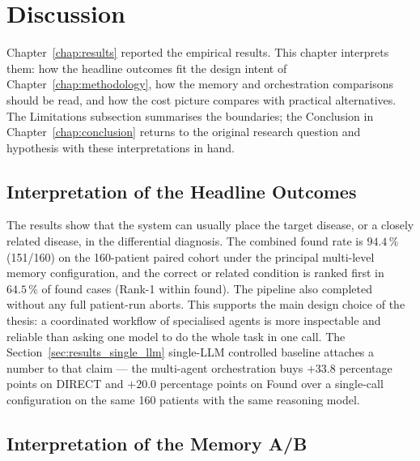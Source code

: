 \chapter{Discussion}
\label{chap:discussion}

Chapter~\ref{chap:results} reported the empirical results. This chapter
interprets them: how the headline outcomes fit the design intent of
Chapter~\ref{chap:methodology}, how the memory and orchestration
comparisons should be read, and how the cost picture compares with
practical alternatives. The Limitations subsection summarises the
boundaries; the Conclusion in Chapter~\ref{chap:conclusion} returns to
the original research question and hypothesis with these
interpretations in hand.

\section{Interpretation of the Headline Outcomes}
\label{sec:discussion_headline}

The results show that the system can usually place the target disease,
or a closely related disease, in the differential diagnosis. The
combined found rate is $94.4\,\%$ (151/160) on the 160-patient paired
cohort under the principal multi-level memory configuration, and the
correct or related condition is ranked first in $64.5\,\%$ of found
cases (Rank-1 within found). The pipeline also completed without any
full patient-run aborts. This supports the main design choice of the
thesis: a coordinated workflow of specialised agents is more
inspectable and reliable than asking one model to do the whole task
in one call. The Section~\ref{sec:results_single_llm} single-LLM
controlled baseline attaches a number to that claim --- the
multi-agent orchestration buys $+33.8$ percentage points on DIRECT
and $+20.0$ percentage points on Found over a single-call
configuration on the same 160 patients with the same reasoning model.

\section{Interpretation of the Memory A/B}
\label{sec:discussion_memory}

